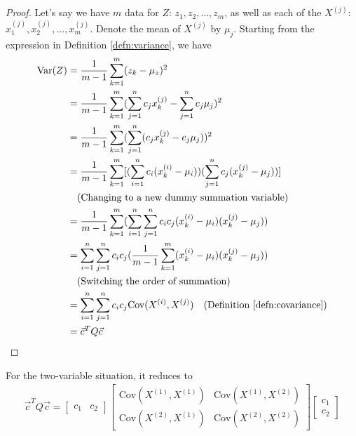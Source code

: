 \begin{proof}
Let's say we have $m$ data for $Z$: $z_1, z_2, \ldots, z_m$, as well as each of the $X^{(j)}$: $x_1^{(j)}, x_2^{(j)}, \ldots, x_m^{(j)}$. Denote the mean of $X^{(j)}$ by $\mu_{j}$. Starting from the expression in Definition \ref{defn:variance}, we have
\begin{align*}
\text{Var}(Z) &= \frac{1}{m-1} \sum_{k=1}^m (z_k - \mu_z)^2 \\
&= \frac{1}{m-1} \sum_{k=1}^m (\sum_{j=1}^{n} c_jx^{(j)}_k - \sum_{j=1}^{n} c_j\mu_{j})^2  \\
&= \frac{1}{m-1} \sum_{k=1}^m (\sum_{j=1}^{n} (c_jx^{(j)}_k - c_j\mu_{j}))^2 \\
&= \frac{1}{m-1} \sum_{k=1}^m [(\sum_{i=1}^{n} c_i(x^{(i)}_k - \mu_{i}))(\sum_{j=1}^{n} c_j(x^{(j)}_k - \mu_{j}))]  \\
&\quad \text{(Changing to a new dummy summation variable)} \\
&= \frac{1}{m-1} \sum_{k=1}^m (\sum_{i=1}^{n}\sum_{j=1}^{n} c_ic_j (x^{(i)}_k - \mu_{i})(x^{(j)}_k - \mu_{j})) \\
&= \sum_{i=1}^{n}\sum_{j=1}^{n} c_ic_j (\frac{1}{m-1} \sum_{k=1}^m (x^{(i)}_k - \mu_{i})(x^{(j)}_k - \mu_{j})) \\
&\quad \text{(Switching the order of summation)} \\
&= \sum_{i=1}^{n}\sum_{j=1}^{n} c_ic_j\text{Cov}(X^{(i)}, X^{(j)}) \quad \text{(Definition \ref{defn:covariance})} \\
&= \vec{c}^T Q\vec{c}
\end{align*}
\end{proof}
For the two-variable situation, it reduces to
\begin{align*}
\vec{c}^TQ\vec{c} =
\begin{bmatrix}
c_1 & c_2
\end{bmatrix}
\begin{bmatrix}
\text{Cov}(X^{(1)}, X^{(1)}) & \text{Cov}(X^{(1)}, X^{(2)}) \\
\text{Cov}(X^{(2)}, X^{(1)}) & \text{Cov}(X^{(2)}, X^{(2)}) 
\end{bmatrix}
\begin{bmatrix}
c_1 \\
c_2
\end{bmatrix}
\end{align*}

